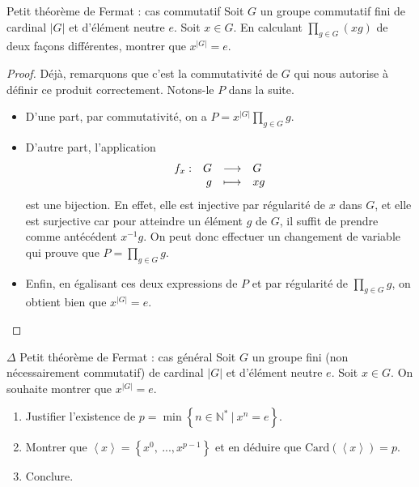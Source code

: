 \documentclass[french,a4paper]{article}
\newcommand{\N}{\mathbb{N}}
\newcommand{\st}{^*}
\newcommand{\inv}{^{-1}}
\newcommand{\card}{\text{Card}}
\theoremstyle{plain}
\theoremstyle{definition}
\theoremstyle{remark}
\begin{document}
\begin{ex}[Morlot]{Petit théorème de Fermat : cas commutatif}
	Soit $G$ un groupe commutatif fini de cardinal $|G|$ et d'élément neutre $e$. Soit $x\in G$. En calculant $\displaystyle \prod_{g \in G}(xg)$ de deux façons différentes, montrer que $x^{|G|}=e$.
\end{ex}

\begin{proof}
	Déjà, remarquons que c'est la commutativité de $G$ qui nous autorise à définir ce produit correctement. Notons-le $P$ dans la suite. 
	\begin{itemize}
		\item D'une part, par commutativité, on a $P=x^{|G|}\displaystyle \prod_{g \in G}g$.
		\item D'autre part, l'application 
		$$\begin{array}[t]{lrcl} 
			f_x : & G & \longrightarrow& G \\
			& g & \longmapsto &xg
		\end{array}$$ 
		est une bijection. En effet, elle est injective par régularité de $x$ dans $G$, et elle est surjective car pour atteindre un élément $g$ de $G$, il suffit de prendre comme antécédent $x\inv g$. On peut donc effectuer un changement de variable qui prouve que $P=\displaystyle \prod_{g \in G}g$.
		\item Enfin, en égalisant ces deux expressions de $P$ et par régularité de $\displaystyle \prod_{g \in G}g$, on obtient bien que $x^{|G|}=e$.
	\end{itemize}
\end{proof}

\begin{ex}[Morlot]{$\Delta$ Petit théorème de Fermat : cas général}
	Soit $G$ un groupe fini (non nécessairement commutatif) de cardinal $|G|$ et d'élément neutre $e$. Soit $x \in G$. On souhaite montrer que $x^{|G|}=e$.
	\begin{enumerate}
		\item Justifier l'existence de $p=\min\left\{n \in\N\st \ | \ x^n=e\right\}$.
		\item Montrer que $\left\langle x\right\rangle=\left\{x^0, \ ..., x^{p-1}\right\}$ et en déduire que $\card(\left\langle x\right\rangle)=p$.
		\item Conclure.
	\end{enumerate}
\end{ex}
\end{document}
